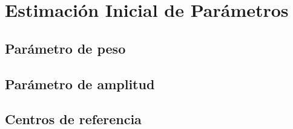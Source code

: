 \chapter{Estimación Inicial de Parámetros}

\section{Parámetro de peso}

\section{Parámetro de amplitud}

\section{Centros de referencia}